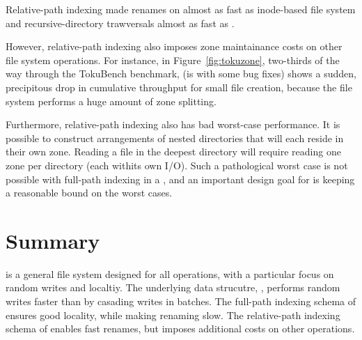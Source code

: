 Relative-path indexing made renames on \betrfsTwo almost as fast as inode-based
file system and recursive-directory trawversals almost as fast as \betrfsOne.

However, relative-path indexing also imposes zone maintainance costs on other
file system operations.
For instance, in Figure~\ref{fig:tokuzone}, two-thirds of the way through the
TokuBench benchmark, \betrfsThree (\betrfsThree is \betrfsTwo with some bug
fixes) shows a sudden, precipitous drop in cumulative
throughput for small file creation, because the file system performs a huge
amount of zone splitting.

Furthermore, relative-path indexing also has bad worst-case performance.
It is possible to construct arrangements of nested directories that will each
reside in their own zone.
Reading a file in the deepest directory will require reading one zone per
directory (each withits own I/O).
Such a pathological worst case is not possible with full-path indexing in a
\bet, and an important design goal for \betrfs is keeping a reasonable bound on
the worst cases.

\section{Summary}

\betrfs is a general file system designed for all operations, with a particular
focus on random writes and localtiy.
The underlying data strucutre, \bets, performs random writes faster than \btrees
by casading writes in batches.
The full-path indexing schema of \betrfsOne ensures good locality, while making
renaming slow.
The relative-path indexing schema of \betrfsTwo enables fast renames,
but imposes additional costs on other operations.

